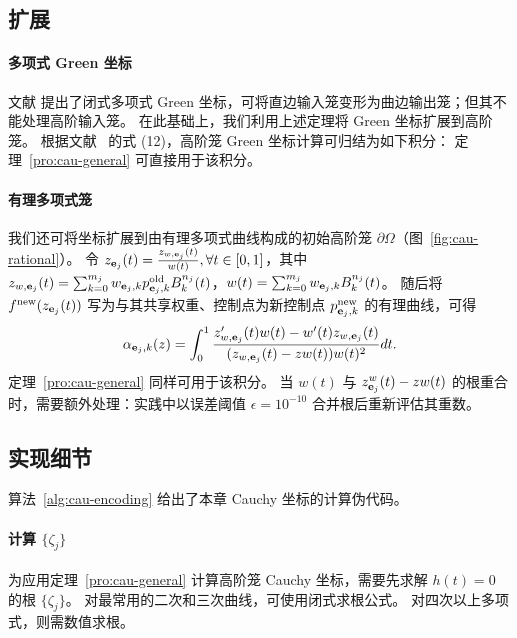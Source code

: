 \subsection{扩展}\label{sec:cau-connection}
\paragraph{多项式 Green 坐标}
文献\cite{MichelThiery2023} 提出了闭式多项式 Green 坐标，可将直边输入笼变形为曲边输出笼；但其不能处理高阶输入笼。
在此基础上，我们利用上述定理将 Green 坐标扩展到高阶笼。
根据文献~\cite{MichelThiery2023} 的式 (12)，高阶笼 Green 坐标计算可归结为如下积分：
定理~\ref{pro:cau-general} 可直接用于该积分。

\paragraph{有理多项式笼}
我们还可将坐标扩展到由有理多项式曲线构成的初始高阶笼 $\partial \Omega$（图~\ref{fig:cau-rational}）。
令 $z_{\mathbf{e}_j}(t) = \frac{z_{w,\mathbf{e}_j}(t)}{w(t)}, \forall t \in [0, 1]$，其中 \(z_{w,\mathbf{e}_j}(t)=\sum_{k=0}^{m_j}w_{\mathbf{e}_j,k}p_{\mathbf{e}_j,k}^{\text{old}}B_k^{n_j}(t)\)，\(w(t)=\sum_{k=0}^{m_j}w_{\mathbf{e}_j,k}B_k^{n_j}(t)\)。
随后将 $f^\text{new}(z_{\mathbf{e}_j}(t))$ 写为与其共享权重、控制点为新控制点 \(p^\text{new}_{\mathbf{e}_j,k}\) 的有理曲线，可得
\begin{equation}
    \alpha_{\mathbf{e}_j,k}(z)=\int_0^1 \frac{z_{w,\mathbf{e}_j}'(t)w(t)-w'(t)z_{w,\mathbf{e}_j}(t)}{(z_{w,\mathbf{e}_j}(t)-zw(t))w(t)^2}dt.
\end{equation}
定理~\ref{pro:cau-general} 同样可用于该积分。
当 \(w(t)\) 与 \(z_{\mathbf{e}_j}^{w}(t)-zw(t)\) 的根重合时，需要额外处理：实践中以误差阈值 \(\epsilon=10^{-10}\) 合并根后重新评估其重数。

\subsection{实现细节}\label{sec:cau-details}
算法~\ref{alg:cau-encoding} 给出了本章 Cauchy 坐标的计算伪代码。

\paragraph{计算 \(\{\zeta_j\}\)}
为应用定理~\ref{pro:cau-general} 计算高阶笼 Cauchy 坐标，需要先求解 $h(t)=0$ 的根 $\{\zeta_j\}$。
对最常用的二次和三次曲线，可使用闭式求根公式。
对四次以上多项式，则需数值求根。

